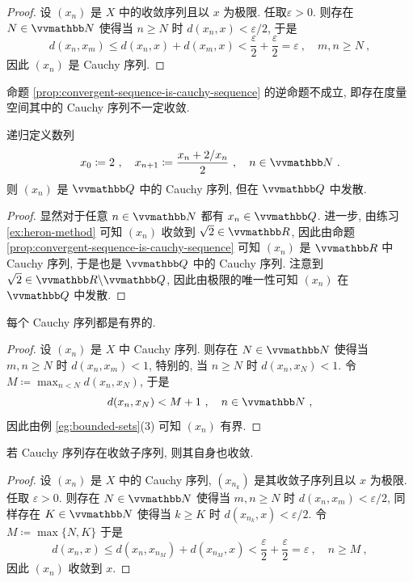 \begin{proof}
    设 \((x_n)\) 是 \(X\) 中的收敛序列且以 \(x\) 为极限. 任取\(\varepsilon > 0\). 则存在 \(N \in \N\) 使得当 \(n \geq N\) 时 \(d(x_n, x) < \varepsilon / 2\), 于是
    \[
        d(x_n, x_m) \leq d(x_n, x) + d(x_m, x) < \frac{\varepsilon}{2} + \frac{\varepsilon}{2} = \varepsilon\ ,\quad m, n \geq N\ ,
    \]
    因此 \((x_n)\) 是 Cauchy 序列.
\end{proof}

命题 \ref{prop:convergent-sequence-is-cauchy-sequence} 的逆命题不成立, 即存在度量空间其中的 Cauchy 序列不一定收敛.

\begin{example}
    递归定义数列
    \[
        x_0 \coloneqq 2\ ,\quad x_{n + 1} \coloneqq \frac{x_n + 2 / x_{n}}{2}\ ,\quad n \in \N\ .
    \]
    则 \((x_n)\) 是 \(\Q\) 中的 Cauchy 序列, 但在 \(\Q\) 中发散.
\end{example}

\begin{proof}
    显然对于任意 \(n \in \N\) 都有 \(x_n \in \Q\). 进一步, 由练习 \ref{ex:heron-method} 可知 \((x_n)\) 收敛到 \(\sqrt{2} \in \R\), 因此由命题 \ref{prop:convergent-sequence-is-cauchy-sequence} 可知 \((x_n)\) 是 \(\R\) 中 Cauchy 序列, 于是也是 \(\Q\) 中的 Cauchy 序列. 注意到 \(\sqrt{2} \in \R \backslash \Q\), 因此由极限的唯一性可知 \((x_n)\) 在 \(\Q\) 中发散.
\end{proof}

\begin{proposition}\label{prop:cauchy-sequence-is-bounded}
    每个 Cauchy 序列都是有界的.
\end{proposition}

\begin{proof}
    设 \((x_n)\) 是 \(X\) 中 Cauchy 序列. 则存在 \(N \in \N\) 使得当 \(m, n \geq N\) 时 \(d(x_n, x_m) < 1\), 特别的, 当 \(n \geq N\) 时 \(d(x_n, x_N) < 1\). 令 \(M \coloneqq \max_{n < N} d(x_n, x_N)\), 于是
    \[
        d(x_n, x_N) < M + 1\ ,\quad n \in \N\ ,
    \]
    因此由例 \ref{eg:bounded-sets}(3) 可知 \((x_n)\) 有界.
\end{proof}

\begin{proposition}\label{prop:cauchy-sequence-with-subsequence}
    若 Cauchy 序列存在收敛子序列, 则其自身也收敛.
\end{proposition}

\begin{proof}
    设 \((x_n)\) 是 \(X\) 中的 Cauchy 序列, \((x_{n_k})\) 是其收敛子序列且以 \(x\) 为极限. 任取 \(\varepsilon > 0\). 则存在 \(N \in \N\) 使得当 \(m, n \geq N\) 时 \(d(x_n, x_m) < \varepsilon / 2\), 同样存在 \(K \in \N\) 使得当 \(k \geq K\) 时 \(d(x_{n_k}, x) < \varepsilon / 2\). 令 \(M \coloneqq \max\{N, K\}\) 于是
    \[
        d(x_n, x) \leq d(x_n, x_{n_M}) + d(x_{n_M}, x) < \frac{\varepsilon}{2} + \frac{\varepsilon}{2} = \varepsilon\ ,\quad n \geq M\ ,
    \]
    因此 \((x_n)\) 收敛到 \(x\).
\end{proof}

